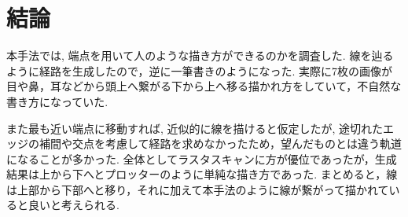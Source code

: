 \chapter{結論}
  \label{chap:conclusion}
  本手法では, 端点を用いて人のような描き方ができるのかを調査した. 線を辿るように経路を生成したので，逆に一筆書きのようになった. 実際に7枚の画像が目や鼻，耳などから頭上へ繋がる下から上へ移る描かれ方をしていて，不自然な書き方になっていた.
 
 また最も近い端点に移動すれば, 近似的に線を描けると仮定したが, 途切れたエッジの補間や交点を考慮して経路を求めなかったため，望んだものとは違う軌道になることが多かった.
  全体としてラスタスキャンに方が優位であったが，生成結果は上から下へとプロッターのように単純な描き方であった.
  まとめると，線は上部から下部へと移り，それに加えて本手法のように線が繋がって描かれていると良いと考えられる.

